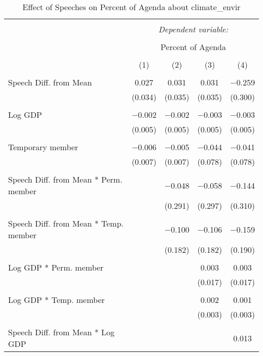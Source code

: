 
\begin{table}[!htbp] \centering 
  \caption{Effect of Speeches on Percent of Agenda about climate_envir} 
  \label{} 
\begin{tabular}{@{\extracolsep{5pt}}lcccc} 
\\[-1.8ex]\hline 
\hline \\[-1.8ex] 
 & \multicolumn{4}{c}{\textit{Dependent variable:}} \\ 
\cline{2-5} 
\\[-1.8ex] & \multicolumn{4}{c}{Percent of Agenda} \\ 
\\[-1.8ex] & (1) & (2) & (3) & (4)\\ 
\hline \\[-1.8ex] 
 Speech Diff. from Mean & 0.027 & 0.031 & 0.031 & $-$0.259 \\ 
  & (0.034) & (0.035) & (0.035) & (0.300) \\ 
  & & & & \\ 
 Log GDP & $-$0.002 & $-$0.002 & $-$0.003 & $-$0.003 \\ 
  & (0.005) & (0.005) & (0.005) & (0.005) \\ 
  & & & & \\ 
 Temporary member & $-$0.006 & $-$0.005 & $-$0.044 & $-$0.041 \\ 
  & (0.007) & (0.007) & (0.078) & (0.078) \\ 
  & & & & \\ 
 Speech Diff. from Mean * Perm. member &  & $-$0.048 & $-$0.058 & $-$0.144 \\ 
  &  & (0.291) & (0.297) & (0.310) \\ 
  & & & & \\ 
 Speech Diff. from Mean * Temp. member &  & $-$0.100 & $-$0.106 & $-$0.159 \\ 
  &  & (0.182) & (0.182) & (0.190) \\ 
  & & & & \\ 
 Log GDP * Perm. member &  &  & 0.003 & 0.003 \\ 
  &  &  & (0.017) & (0.017) \\ 
  & & & & \\ 
 Log GDP * Temp. member &  &  & 0.002 & 0.001 \\ 
  &  &  & (0.003) & (0.003) \\ 
  & & & & \\ 
 Speech Diff. from Mean * Log GDP &  &  &  & 0.013 \\ 

\end{tabular}
\end{table}
